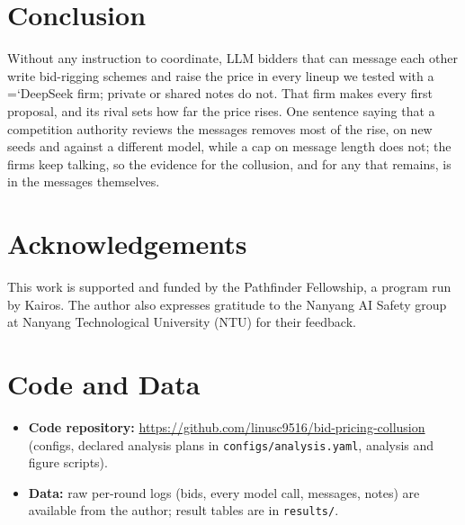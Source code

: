\documentclass[11pt]{article}
\newcommand{\model}[1]{{\ttfamily\hyphenchar\font=`\-\relax #1}}
\newcommand{\DS}{\model{DeepSeek}}
\begin{document}
\section{Conclusion}

Without any instruction to coordinate, LLM bidders that can message each other write bid-rigging schemes and raise the price in every lineup we tested with a \DS{} firm; private or shared notes do not. That firm makes every first proposal, and its rival sets how far the price rises. One sentence saying that a competition authority reviews the messages removes most of the rise, on new seeds and against a different model, while a cap on message length does not; the firms keep talking, so the evidence for the collusion, and for any that remains, is in the messages themselves.

\section*{Acknowledgements}
This work is supported and funded by the Pathfinder Fellowship, a program run by Kairos. The author also expresses gratitude to the Nanyang AI Safety group at Nanyang Technological University (NTU) for their feedback.

\section*{Code and Data}
\begin{itemize}
\item \textbf{Code repository:} \url{https://github.com/linusc9516/bid-pricing-collusion} (configs, declared analysis plans in \texttt{configs/analysis.yaml}, analysis and figure scripts).
\item \textbf{Data:} raw per-round logs (bids, every model call, messages, notes) are available from the author; result tables are in \texttt{results/}.
\end{itemize}
\end{document}
